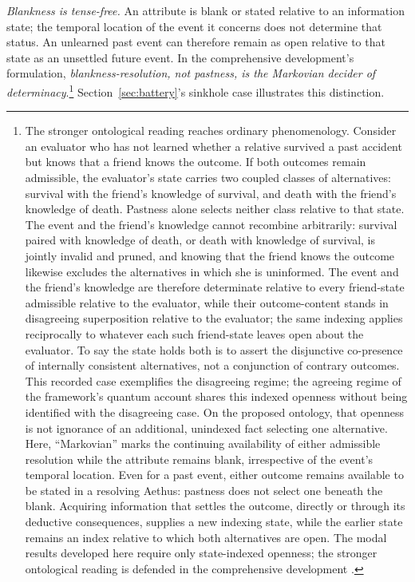 \textit{Blankness is tense-free.} An attribute is blank or stated relative to an information state; the temporal location of the event it concerns does not determine that status. An unlearned past event can therefore remain as open relative to that state as an unsettled future event.
In the comprehensive development's formulation, \emph{blankness-resolution, not pastness, is the Markovian decider of determinacy}.\footnote{The stronger ontological reading reaches ordinary phenomenology. Consider an evaluator who has not learned whether a relative survived a past accident but knows that a friend knows the outcome. If both outcomes remain admissible, the evaluator's state carries two coupled classes of alternatives: survival with the friend's knowledge of survival, and death with the friend's knowledge of death. Pastness alone selects neither class relative to that state. The event and the friend's knowledge cannot recombine arbitrarily: survival paired with knowledge of death, or death with knowledge of survival, is jointly invalid and pruned, and knowing that the friend knows the outcome likewise excludes the alternatives in which she is uninformed. The event and the friend's knowledge are therefore determinate relative to every friend-state admissible relative to the evaluator, while their outcome-content stands in disagreeing superposition relative to the evaluator; the same indexing applies reciprocally to whatever each such friend-state leaves open about the evaluator. To say the state holds both is to assert the disjunctive co-presence of internally consistent alternatives, not a conjunction of contrary outcomes. This recorded case exemplifies the disagreeing regime; the agreeing regime of the framework's quantum account shares this indexed openness without being identified with the disagreeing case. On the proposed ontology, that openness is not ignorance of an additional, unindexed fact selecting one alternative. Here, ``Markovian'' marks the continuing availability of either admissible resolution while the attribute remains blank, irrespective of the event's temporal location. Even for a past event, either outcome remains available to be stated in a resolving Aethus: pastness does not select one beneath the blank. Acquiring information that settles the outcome, directly or through its deductive consequences, supplies a new indexing state, while the earlier state remains an index relative to which both alternatives are open. The modal results developed here require only state-indexed openness; the stronger ontological reading is defended in the comprehensive development \parencite{Aethus}.}
Section~\ref{sec:battery}'s sinkhole case illustrates this distinction.

